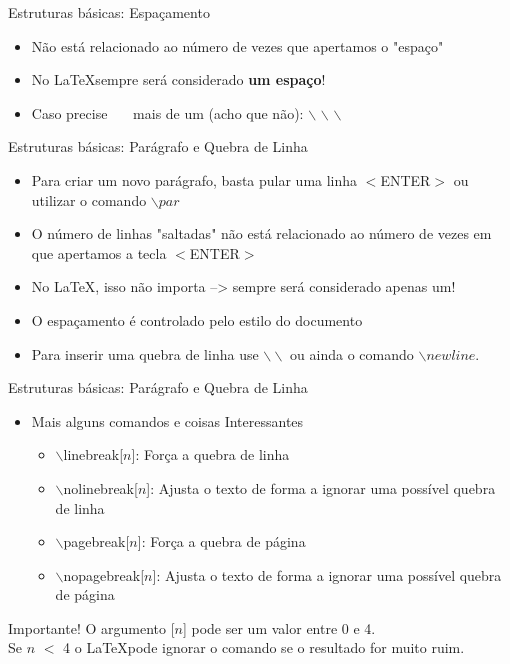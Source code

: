 \begin{frame}{Estruturas básicas: Espaçamento}
    \begin{itemize}
        \item Não está relacionado ao número de vezes que apertamos o "espaço"
        \item No \LaTeX sempre será considerado \textbf{um espaço}!
        \item Caso precise \ \ \  mais de um (acho que não): $\backslash $ $\backslash $ $\backslash $
    \end{itemize}
\end{frame}


\begin{frame}{Estruturas básicas: Parágrafo e Quebra de Linha}
    \begin{itemize}
        \item Para criar um novo parágrafo, basta pular uma linha $<$ENTER$>$ ou utilizar o  comando $\backslash par$
        \item O número de linhas "saltadas" não está relacionado ao número de vezes em que apertamos a tecla $<$ENTER$>$
        \item No \LaTeX, isso não importa --> sempre será considerado apenas um!
        \item O espaçamento é controlado pelo estilo do documento
        \item Para inserir uma quebra de linha use $\backslash \backslash$ ou ainda o comando $\backslash newline$.
    \end{itemize}
\end{frame}

\begin{frame}{Estruturas básicas: Parágrafo e Quebra de Linha}
    \begin{itemize}
        \item  Mais alguns comandos e coisas Interessantes
        \begin{itemize}        
            \item $\backslash$linebreak[$n$]: Força a quebra de linha
            \item $\backslash$nolinebreak[$n$]: Ajusta o texto de forma a ignorar uma            possível quebra de linha
            \item $\backslash$pagebreak[$n$]: Força a quebra de página
            \item $\backslash$nopagebreak[$n$]: Ajusta o texto de forma a ignorar uma
            possível quebra de página
        \end{itemize}
    \end{itemize}
    \begin{block}{Importante!}
        O argumento [$n$] pode ser um valor entre 0 e 4.\\ Se $n$ $<$ 4 o \LaTeX pode ignorar o comando se o resultado for muito ruim.
    \end{block}
\end{frame}

